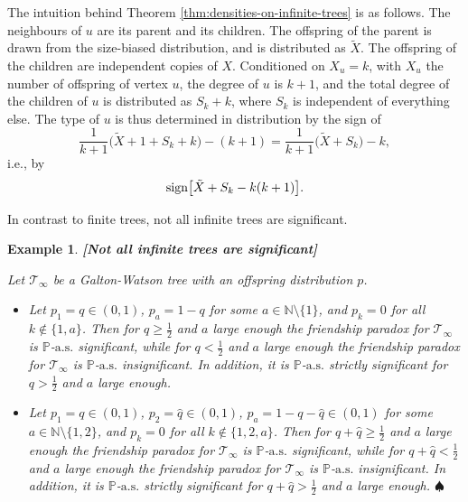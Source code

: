 \documentclass[11pt]{article}
\numberwithin{equation}{section}
\theoremstyle{plain}
\newtheorem{example}[theorem]{Example}
\newcommand{\N}{\mathbb N}
\newcommand{\PP}{\mathbb{P}}
\newcommand{\tX}{\tilde{X}}
\begin{document}
The intuition behind Theorem \ref{thm:densities-on-infinite-trees} is as follows. The neighbours of $u$ are its parent and its children. The offspring of the parent is drawn from the size-biased distribution, and is distributed as $\tX$. The offspring of the children are independent copies of $X$. Conditioned on $X_u=k$, with $X_u$ the number of offspring of vertex $u$,  the degree of $u$ is $k+1$, and the total degree of the children of $u$ is distributed as $S_k+k$, where $S_k$ is independent of everything else. The type of $u$ is thus determined in distribution by the sign of 
\[
\frac{1}{k+1}\big(\tX+1+S_k+k\big)-(k+1)=\frac{1}{k+1}\big(\tX+S_k\big)-k,
\]
i.e., by 
\[
{\rm sign}\big[\tX+S_k-k(k+1)\big].
\]

In contrast to finite trees, not all infinite trees are significant.

\begin{example}{\bf [Not all infinite trees are significant]}
\label{ex:GW-non-significant}
{\rm Let $\mathcal{T}_\infty$ be a Galton-Watson tree with an offspring distribution $p$.
\begin{itemize}
\item[(a)] Let $p_1= q \in (0,1)$, $p_a = 1-q$ for some $a \in \N\setminus\{1\}$, and $p_k = 0$ for all $k \notin \{1,a\}$. Then for $q\geq\tfrac12$ and $a$ large enough the friendship paradox for $\mathcal{T}_\infty$ is $\PP$-$\mathrm{a.s.}$ significant, while for $q<\tfrac12$ and $a$ large enough the friendship paradox for $\mathcal{T}_\infty$ is $\PP$-$\mathrm{a.s.}$ insignificant. In addition, it is $\PP$-$\mathrm{a.s.}$ strictly significant for $q>\tfrac12$ and $a$ large enough.
\item[(b)] Let $p_1 = q \in (0,1)$, $p_{2} =\hat{q} \in (0,1)$, $p_a = 1-q-\hat{q}\in (0,1)$ for some $a \in \N\setminus\{1,2\}$, and $p_k = 0$ for all $k \notin \{1,2,a\}$. Then for $q+\hat{q}\geq\tfrac12$ and $a$ large enough the friendship paradox for $\mathcal{T}_\infty$ is $\PP$-$\mathrm{a.s.}$ significant, while for $q+\hat{q}<\tfrac12$ and $a$ large enough the friendship paradox for $\mathcal{T}_\infty$ is $\PP$-$\mathrm{a.s.}$ insignificant. In addition, it is $\PP$-$\mathrm{a.s.}$ strictly significant for $q+\hat{q}>\tfrac12$ and $a$ large enough. \hfill$\spadesuit$
\end{itemize}
}
\end{example}
\end{document}
